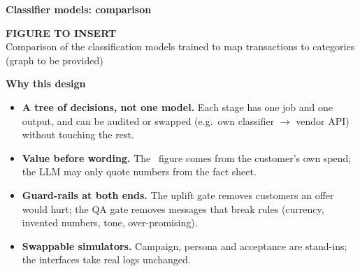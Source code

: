 \documentclass[8pt,a4paper]{extarticle}
\newcommand{\eur}{\texteuro}
\newcommand{\sect}[1]{{\color{navy}\bfseries\small #1}\par\vspace{-3pt}{\color{navy}\rule{\linewidth}{0.6pt}}\par\vspace{1pt}}
\begin{document}
\begin{minipage}[t]{0.43\textwidth}
\sect{Classifier models: comparison}
\begin{tcolorbox}[enhanced,colback=gray!5,colframe=white,boxrule=0pt,borderline={0.6pt}{0pt}{cg,dashed},arc=2pt,
  height=4.0cm,valign=center,halign=center,left=3pt,right=3pt,top=2pt,bottom=2pt]
{\small\bfseries\color{cg}FIGURE TO INSERT}\\[2pt]
{\scriptsize Comparison of the classification models trained to map transactions to categories (graph to be provided)}
\end{tcolorbox}
\end{minipage}\hfill
\begin{minipage}[t]{0.55\textwidth}
\sect{Why this design}
\begin{itemize}
\item \textbf{A tree of decisions, not one model.} Each stage has one job and one output, and can be audited or swapped (e.g.\ own classifier $\to$ vendor API) without touching the rest.
\item \textbf{Value before wording.} The \eur\ figure comes from the customer's own spend; the LLM may only quote numbers from the fact sheet.
\item \textbf{Guard-rails at both ends.} The uplift gate removes customers an offer would hurt; the QA gate removes messages that break rules (currency, invented numbers, tone, over-promising).
\item \textbf{Swappable simulators.} Campaign, persona and acceptance are stand-ins; the interfaces take real logs unchanged.
\end{itemize}
\end{minipage}
\end{document}
